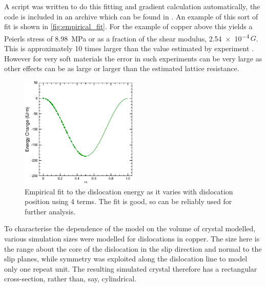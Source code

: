 A script was written to do this fitting and gradient calculation automatically, the code is included in an archive which can be found in \cite{code}. An example of this sort of fit is shown in \autoref{fig:empirical_fit}. For the example of copper above this yields a Peierls stress of \SI{8.98}{\mega\pascal} or as a fraction of the shear modulus, \num{2.54e-4}\,$G$. This is approximately 10 times larger than the value estimated by experiment \cite{Wang1996}. However for very soft materials the error in such experiments can be very large as other effects can be as large or larger than the estimated lattice resistance.

\begin{figure}
\centering
\includegraphics[width=0.5\textwidth]{Empirical_Fit}
\caption[Empirical fit to the variation in energy with dislocation position.]{Empirical fit to the dislocation energy as it varies with dislocation position using 4 terms. The fit is good, so can be reliably used for further analysis.\label{fig:empirical_fit}}
\end{figure}


To characterise the dependence of the model on the volume of crystal modelled, various simulation sizes were modelled for dislocations in copper. The size here is the range about the core of the dislocation in the slip direction and normal to the slip planes, while symmetry was exploited along the dislocation line to model only one repeat unit. The resulting simulated crystal therefore has a rectangular cross-section, rather than, say, cylindrical.


